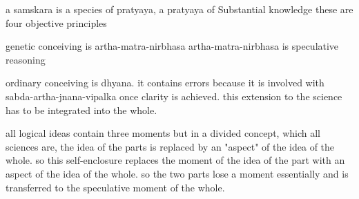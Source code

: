 a samskara is a species of pratyaya,
a pratyaya of Substantial knowledge
these are four objective principles

genetic conceiving is artha-matra-nirbhasa
artha-matra-nirbhasa is speculative reasoning

ordinary conceiving is dhyana.
it contains errors because it is involved with sabda-artha-jnana-vipalka
once clarity is achieved. this extension to the science has to be
integrated into the whole.

all logical ideas contain three moments but in a divided concept,
which all sciences are, the idea of the parts is replaced by an
"aspect" of the idea of the whole. so this self-enclosure
replaces the moment of the idea of the part with an aspect
of the idea of the whole.
so the two parts lose a moment essentially and is transferred
to the speculative moment of the whole.
